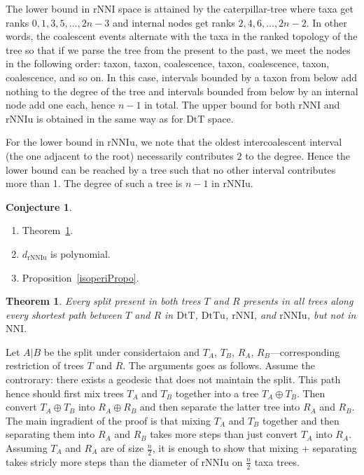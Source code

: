 \documentclass{amsart}
\newtheorem{theorem}[lemma]{Theorem}
\theoremstyle{definition}
\newtheorem{conjecture}[lemma]{Conjecture}
\newcommand{\nni}{\mathrm{NNI}}
\newcommand{\rnni}{\mathrm{rNNI}}
\newcommand{\rnniu}{\mathrm{rNNIu}}
\newcommand{\mdts}{\mathrm{DtT}}
\newcommand{\mdtsu}{\mathrm{DtTu}}
\begin{document}
The lower bound in $\rnni$ space is attained by the caterpillar-tree where taxa get ranks $0, 1, 3, 5, \ldots, 2n-3$ and internal nodes get ranks $2, 4, 6, \ldots, 2n-2$.
In other words, the coalescent events alternate with the taxa in the ranked topology of the tree so that if we parse the tree from the present to the past, we meet the nodes in the following order: taxon, taxon, coalescence, taxon, coalescence, taxon, coalescence, and so on.
In this case, intervals bounded by a taxon from below add nothing to the degree of the tree and intervals bounded from below by an internal node add one each, hence $n-1$ in total.
The upper bound for both $\rnni$ and $\rnniu$ is obtained in the same way as for $\mdts$ space.

For the lower bound in $\rnniu$, we note that the oldest intercoalescent interval (the one adjacent to the root) necessarily contributes $2$ to the degree.
Hence the lower bound can be reached by a tree such that no other interval contributes more than 1.
The degree of such a tree is $n-1$ in $\rnniu$.
\endproof

\begin{conjecture}
\begin{enumerate}[(1)]
The list of conjectures that would be nice to settle or refute in this paper:
\item Theorem~\ref{splitTheo}.
\item $d_\rnniu$ is polynomial.
\item Proposition~\ref{isoperiPropo}.
\end{enumerate}
\end{conjecture}

\begin{theorem}\label{splitTheo}
Every split present in both trees $T$ and $R$ presents in all trees along every shortest path between $T$ and $R$ in $\mdts$, $\mdtsu$, $\rnni$, and $\rnniu$, but not in $\nni$.
\end{theorem}

\proof
Let $A|B$ be the split under considertaion and $T_A$, $T_B$, $R_A$, $R_B$---corresponding restriction of trees $T$ and $R$.
The arguments goes as follows.
Assume the controrary: there exists a geodesic that does not maintain the split.
This path hence should first mix trees $T_A$ and $T_B$ together into a tree $T_A \oplus T_B$.
Then convert $T_A \oplus T_B$ into $R_A \oplus R_B$ and then separate the latter tree into $R_A$ and $R_B$.
The main ingradient of the proof is that mixing $T_A$ and $T_B$ together and then separating them into $R_A$ and $R_B$ takes more steps than just convert $T_A$ into $R_A$.
Assuming $T_A$ and $R_A$ are of size $\frac n2$, it is enough to show that mixing + separating takes stricly more steps than the diameter of $\rnniu$ on $\frac n2$ taxa trees.
\end{document}
